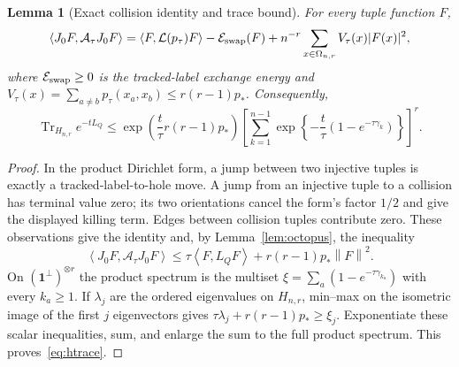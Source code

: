 \documentclass[11pt]{article}
\newtheorem{lemma}[theorem]{Lemma}
\theoremstyle{remark}
\newcommand{\Tr}{\operatorname{Tr}}
\newcommand{\ind}{\mathbf 1}
\newcommand{\norm}[1]{\left\lVert #1\right\rVert}
\newcommand{\ip}[2]{\left\langle #1,#2\right\rangle}
\begin{document}
\begin{lemma}[Exact collision identity and trace bound]\label{lem:zero}
For every tuple function $F$,
\[
 \ip{J_0F}{\mathcal A_\tau J_0F}
 =\ip{F}{\mathcal L(p_\tau)F}-\mathcal E_{\rm swap}(F)
   +n^{-r}\sum_{x\in\Omega_{n,r}}V_\tau(x)|F(x)|^2,
\]
where $\mathcal E_{\rm swap}\geq0$ is the tracked-label exchange energy and
$V_\tau(x)=\sum_{a\ne b}p_\tau(x_a,x_b)\leq r(r-1)p_*$. Consequently,
\begin{equation}\label{eq:htrace}
 \Tr_{H_{n,r}}e^{-tL_Q}
 \leq \exp\!\left(\frac t\tau r(r-1)p_*\right)
 \left[\sum_{k=1}^{n-1}\exp\!\left\{-\frac t\tau(1-e^{-\tau\gamma_k})\right\}\right]^r.
\end{equation}
\end{lemma}
\begin{proof}
In the product Dirichlet form, a jump between two injective tuples is exactly a tracked-label-to-hole move. A jump from an injective tuple to a collision has terminal value zero; its two orientations cancel the form's factor $1/2$ and give the displayed killing term. Edges between collision tuples contribute zero. These observations give the identity and, by Lemma~\ref{lem:octopus}, the inequality
\[
 \ip{J_0F}{\mathcal A_\tau J_0F}
 \leq\tau\ip{F}{L_QF}+r(r-1)p_*\norm F^2.
\]
On $(\ind^\perp)^{\otimes r}$ the product spectrum is the multiset
$\xi=\sum_a(1-e^{-\tau\gamma_{k_a}})$ with every $k_a\geq1$.
If $\lambda_j$ are the ordered eigenvalues on $H_{n,r}$, min--max on the isometric image of the first $j$ eigenvectors gives
$\tau\lambda_j+r(r-1)p_*\geq\xi_j$. Exponentiate these scalar inequalities, sum, and enlarge the sum to the full product spectrum. This proves~\eqref{eq:htrace}.
\end{proof}
\end{document}
